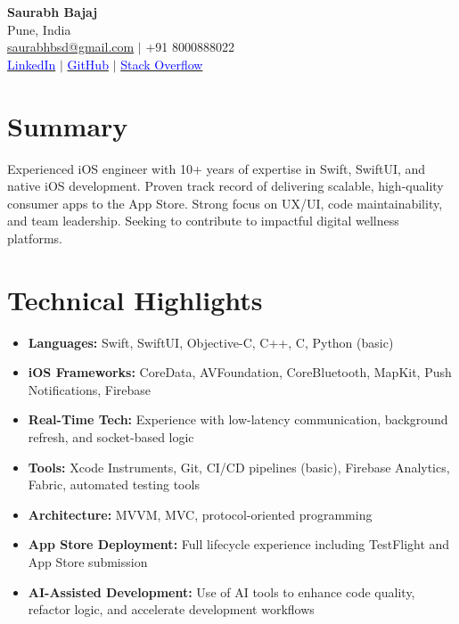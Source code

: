 \documentclass[a4paper,10pt]{article}
\begin{document}
\begin{center}
    {\LARGE \textbf{Saurabh Bajaj}} \\[1ex]
    Pune, India \\[0.5ex]
    \href{mailto:saurabhbsd@gmail.com}{saurabhbsd@gmail.com} $\vert$ +91 8000888022 \\[0.5ex]
    \href{https://www.linkedin.com/in/saurabhbajajcode}{\textcolor{blue}{LinkedIn}} $\vert$ \href{https://github.com/saurabhbajajcode}{\textcolor{blue}{GitHub}} $\vert$ \href{https://stackoverflow.com/users/4284063/saurabh-bajaj}{\textcolor{blue}{Stack Overflow}}
\end{center}

\section*{Summary}
Experienced iOS engineer with 10+ years of expertise in Swift, SwiftUI, and native iOS development. Proven track record of delivering scalable, high-quality consumer apps to the App Store. Strong focus on UX/UI, code maintainability, and team leadership. Seeking to contribute to impactful digital wellness platforms.

\section*{Technical Highlights}
\begin{itemize}[noitemsep,topsep=0pt]
    \item \textbf{Languages:} Swift, SwiftUI, Objective-C, C++, C, Python (basic)
    \item \textbf{iOS Frameworks:} CoreData, AVFoundation, CoreBluetooth, MapKit, Push Notifications, Firebase
    \item \textbf{Real-Time Tech:} Experience with low-latency communication, background refresh, and socket-based logic
    \item \textbf{Tools:} Xcode Instruments, Git, CI/CD pipelines (basic), Firebase Analytics, Fabric, automated testing tools
    \item \textbf{Architecture:} MVVM, MVC, protocol-oriented programming
    \item \textbf{App Store Deployment:} Full lifecycle experience including TestFlight and App Store submission
    \item \textbf{AI-Assisted Development:} Use of AI tools to enhance code quality, refactor logic, and accelerate development workflows
\end{itemize}
\end{document}
